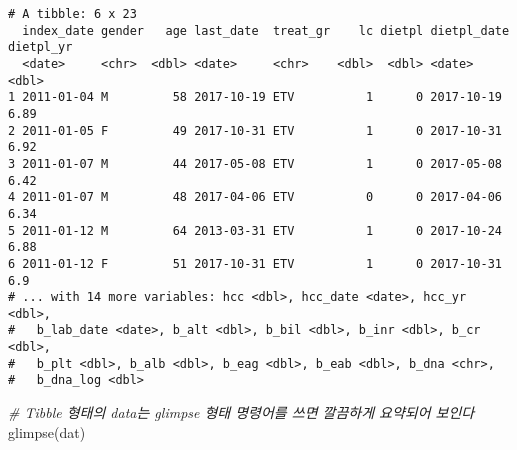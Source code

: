 \documentclass[
]{article}
\newenvironment{Shaded}{\begin{snugshade}}{\end{snugshade}}
\newcommand{\CommentTok}[1]{\textcolor[rgb]{0.56,0.35,0.01}{\textit{#1}}}
\newcommand{\FunctionTok}[1]{\textcolor[rgb]{0.00,0.00,0.00}{#1}}
\newcommand{\NormalTok}[1]{#1}
\begin{document}
\begin{verbatim}
# A tibble: 6 x 23
  index_date gender   age last_date  treat_gr    lc dietpl dietpl_date dietpl_yr
  <date>     <chr>  <dbl> <date>     <chr>    <dbl>  <dbl> <date>          <dbl>
1 2011-01-04 M         58 2017-10-19 ETV          1      0 2017-10-19       6.89
2 2011-01-05 F         49 2017-10-31 ETV          1      0 2017-10-31       6.92
3 2011-01-07 M         44 2017-05-08 ETV          1      0 2017-05-08       6.42
4 2011-01-07 M         48 2017-04-06 ETV          0      0 2017-04-06       6.34
5 2011-01-12 M         64 2013-03-31 ETV          1      0 2017-10-24       6.88
6 2011-01-12 F         51 2017-10-31 ETV          1      0 2017-10-31       6.9 
# ... with 14 more variables: hcc <dbl>, hcc_date <date>, hcc_yr <dbl>,
#   b_lab_date <date>, b_alt <dbl>, b_bil <dbl>, b_inr <dbl>, b_cr <dbl>,
#   b_plt <dbl>, b_alb <dbl>, b_eag <dbl>, b_eab <dbl>, b_dna <chr>,
#   b_dna_log <dbl>
\end{verbatim}

\begin{Shaded}
\begin{Highlighting}[]
\CommentTok{\# Tibble 형태의 data는 glimpse 형태 명령어를 쓰면 깔끔하게 요약되어 보인다}
\FunctionTok{glimpse}\NormalTok{(dat)}
\end{Highlighting}
\end{Shaded}
\end{document}
